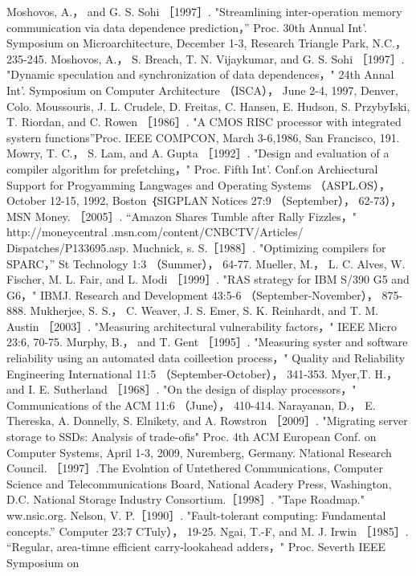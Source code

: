 Moshovos, A.， and G. S. Sohi ［1997］. "Streamlining inter-operation memory communication via data dependence prediction，”
Proc. 30th Annual Int'. Symposium on Microarchitecture, December 1-3, Research Triangle Park, N.C.， 235-245.
Moshovos, A.， S. Breach, T. N. Vijaykumar, and G. S. Sohi ［1997］. "Dynamic speculation and synchronization of data
dependences，" 24th Annal Int'. Symposium on Computer Architecture （ISCA）， June 2-4, 1997, Denver, Colo. Moussouris, J.
L. Crudele, D. Freitas, C. Hansen, E. Hudson, S. PrzybyIski, T. Riordan, and C. Rowen ［1986］. "A CMOS RISC processor
with integrated systern functions”Proc. IEEE COMPCON, March 3-6,1986, San Francisco, 191.
Mowry, T. C.， S. Lam, and A. Gupta ［1992］. "Design and evaluation of a compiler algorithm for prefetching，" Proc. Fifth Int'.
Conf.on Archiectural Support for Progyamming Langwages and Operating Systems （ASPL.OS）， October 12-15, 1992, Boston
｛SIGPLAN Notices 27:9 （September）， 62-73），
MSN Money. ［2005］. “Amazon Shares Tumble after Rally Fizzles，" http://moneycentral .msn.com/content/CNBCTV/Articles/
Dispatches/P133695.asp.
Muchnick, s. S.［1988］. "Optimizing compilers for SPARC，” St Technology 1:3 （Summer）， 64-77.
Mueller, M.， L. C. Alves, W. Fischer, M. L. Fair, and L. Modi ［1999］. "RAS strategy for IBM S/390 G5 and G6，" IBMJ. Research
and Development 43:5-6 （September-November）， 875-888.
Mukherjee, S. S.， C. Weaver, J. S. Emer, S. K. Reinhardt, and T. M. Austin ［2003］. "Measuring architectural vulnerability
factors，" IEEE Micro 23:6, 70-75.
Murphy, B.， and T. Gent ［1995］. "Measuring syster and software reliability using an automated data coilleetion process，" Quality
and Reliability Engineering International 11:5 （September-October）， 341-353.
Myer,T. H.， and I. E. Sutherland ［1968］. "On the design of display processors，" Communications of the ACM 11:6 （June），
410-414.
Narayanan, D.， E. Thereska, A. Donnelly, S. Elnikety, and A. Rowstron ［2009］. "Migrating server storage to SSDs: Analysis of
trade-ofis" Proc. 4th ACM European Conf. on Computer Systems, April 1-3, 2009, Nuremberg, Germany.
N!ational Research Council. ［1997］.The Evolntion of Untethered Communications, Computer Science and Telecommunications
Board, National Acadery Press, Washington, D.C.
National Storage Industry Consortium.［1998］. "Tape Roadmap." ww.nsic.org.
Nelson, V. P.［1990］. "Fault-tolerant computing: Fundamental concepts.” Computer 23:7 CTuly）， 19-25.
Ngai, T.-F, and M. J. Irwin ［1985］. “Regular, area-timne efficient carry-lookahead adders，" Proc. Severth IEEE Symposium on
